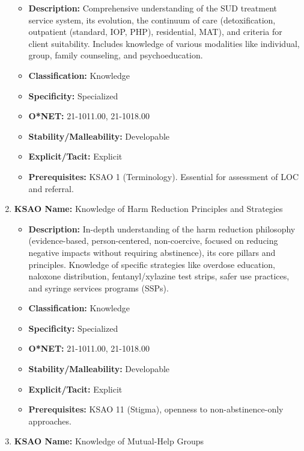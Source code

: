 \documentclass[
  letterpaper,
  DIV=11,
  numbers=noendperiod]{scrartcl}
\providecommand{\tightlist}{%
  \setlength{\itemsep}{0pt}\setlength{\parskip}{0pt}}
\begin{document}
\begin{enumerate}
  \begin{itemize}
  \tightlist
  \item
    \textbf{Description:} Comprehensive understanding of the SUD
    treatment service system, its evolution, the continuum of care
    (detoxification, outpatient (standard, IOP, PHP), residential, MAT),
    and criteria for client suitability. Includes knowledge of various
    modalities like individual, group, family counseling, and
    psychoeducation.
  \item
    \textbf{Classification:} Knowledge
  \item
    \textbf{Specificity:} Specialized
  \item
    \textbf{O*NET:} 21-1011.00, 21-1018.00
  \item
    \textbf{Stability/Malleability:} Developable
  \item
    \textbf{Explicit/Tacit:} Explicit
  \item
    \textbf{Prerequisites:} KSAO 1 (Terminology). Essential for
    assessment of LOC and referral.
  \end{itemize}
\item
  \textbf{KSAO Name:} Knowledge of Harm Reduction Principles and
  Strategies

  \begin{itemize}
  \tightlist
  \item
    \textbf{Description:} In-depth understanding of the harm reduction
    philosophy (evidence-based, person-centered, non-coercive, focused
    on reducing negative impacts without requiring abstinence), its core
    pillars and principles. Knowledge of specific strategies like
    overdose education, naloxone distribution, fentanyl/xylazine test
    strips, safer use practices, and syringe services programs (SSPs).
  \item
    \textbf{Classification:} Knowledge
  \item
    \textbf{Specificity:} Specialized
  \item
    \textbf{O*NET:} 21-1011.00, 21-1018.00
  \item
    \textbf{Stability/Malleability:} Developable
  \item
    \textbf{Explicit/Tacit:} Explicit
  \item
    \textbf{Prerequisites:} KSAO 11 (Stigma), openness to
    non-abstinence-only approaches.
  \end{itemize}
\item
  \textbf{KSAO Name:} Knowledge of Mutual-Help Groups


\end{enumerate}
\end{document}
